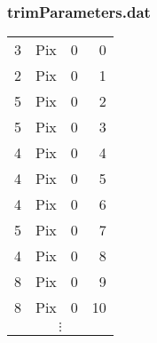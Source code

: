 \subsubsection{trimParameters.dat}
\ubuntu
\begin{tabular}{lllr}
\hline
3	&	Pix	&	0	&	0	\\
2	&	Pix	&	0	&	1	\\
5	&	Pix	&	0	&	2	\\
5	&	Pix	&	0	&	3	\\
4	&	Pix	&	0	&	4	\\
4	&	Pix	&	0	&	5	\\
4	&	Pix	&	0	&	6	\\
5	&	Pix	&	0	&	7	\\
4	&	Pix	&	0	&	8	\\
8	&	Pix	&	0	&	9	\\
8	&	Pix	&	0	&	10	\\
\multicolumn{4}{c}{$\vdots$}\\
\hline
\end{tabular}
